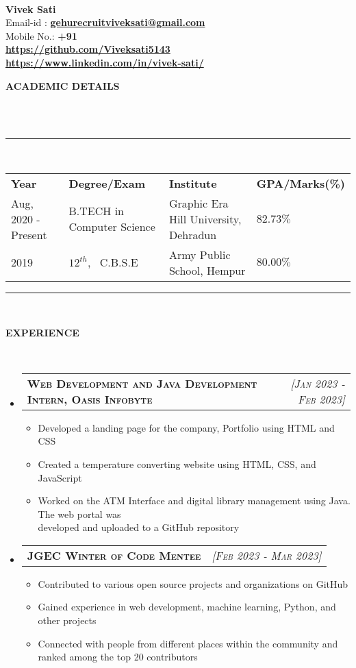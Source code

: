\documentclass[a4paper,10pt]{article}
\makeatletter
\newcommand{\lsep}{-0.5cm}
\newcommand{\resitem}[1]{\item #1 \vspace{-2pt}}
\newcommand{\resheading}[1]{{\small \colorbox{mygrey}{\begin{minipage}{0.975\textwidth}{\textbf{#1 \vphantom{p\^{E}}}}\end{minipage}}}}
\newcommand{\ressubheading}[3]{
\begin{tabular*}{6.62in}{l @{\extracolsep{\fill}} r}
	\textsc{{\textbf{#1}}} & \textsc{\textit{[#2]}} \\
\end{tabular*}\vspace{-8pt}}
\makeatother
\begin{document}
\hspace{0.5cm}\\[-0.2cm]

\textbf{Vivek Sati} \\
\indent Email-id : \textbf{\url{gehurecruitviveksati@gmail.com}} \\
\indent Mobile No.: \textbf{+91  } \ \\
\indent \textbf{\url{https://github.com/Viveksati5143}}\\
\indent \textbf{\url{https://www.linkedin.com/in/vivek-sati/}}\\

\resheading{\textbf{ACADEMIC DETAILS} }\\[\lsep]
\\
\indent \rule{6.8in}{0.4pt}\\
\indent \begin{tabular}{ l @{\hskip 0.15in} l @{\hskip 0.15in} l @{\hskip 0.15in} l @{\hskip 0.15in} }
\noindent \textbf{Year} & \textbf{Degree/Exam} & \textbf{Institute} & \textbf{GPA/Marks(\%)} \\
Aug, 2020 - Present & B.TECH in Computer Science & Graphic Era Hill University, Dehradun & $82.73 \%$ \\
2019 & $12^{th}$, \ C.B.S.E & Army Public School, Hempur & $80.00 \%$ \\

\end{tabular}
\indent \rule{6.8in}{0.4pt}
\\

\resheading{\textbf{EXPERIENCE} }\\[\lsep]
\begin{itemize}
\setlength\itemsep{0.5em}
\item \ressubheading{Web Development and Java Development Intern, Oasis Infobyte}{Jan 2023 - Feb 2023}{}
\begin{itemize}
    \resitem{Developed a landing page for the company, Portfolio using HTML and CSS}
    \resitem{Created a temperature converting website using HTML, CSS, and JavaScript}
    \resitem{Worked on the ATM Interface and digital library management using Java. The web portal was \\ developed and uploaded to a GitHub repository}
\end{itemize}
\item \ressubheading{JGEC Winter of Code Mentee}{Feb 2023 - Mar 2023}{}
\begin{itemize}
    \resitem{Contributed to various open source projects and organizations on GitHub}
    \resitem{Gained experience in web development, machine learning, Python, and other projects}
    \resitem{Connected with people from different places within the community and ranked among the top 20 contributors}
\end{itemize}
\end{itemize}
\end{document}
